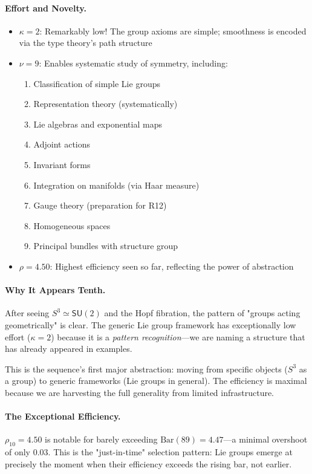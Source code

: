 \documentclass[11pt]{article}
\theoremstyle{definition}
\begin{document}
\paragraph{Effort and Novelty.}
\begin{itemize}
\item $\kappa = 2$: Remarkably low! The group axioms are simple; smoothness is encoded via the type theory's path structure
\item $\nu = 9$: Enables systematic study of symmetry, including:
\begin{enumerate}
\item Classification of simple Lie groups
\item Representation theory (systematically)
\item Lie algebras and exponential maps
\item Adjoint actions
\item Invariant forms
\item Integration on manifolds (via Haar measure)
\item Gauge theory (preparation for R12)
\item Homogeneous spaces
\item Principal bundles with structure group
\end{enumerate}
\item $\rho = 4.50$: Highest efficiency seen so far, reflecting the power of abstraction
\end{itemize}

\paragraph{Why It Appears Tenth.}
After seeing $S^3 \simeq \mathsf{SU}(2)$ and the Hopf fibration, the pattern of "groups acting geometrically" is clear. The generic Lie group framework has exceptionally low effort ($\kappa=2$) because it is a \emph{pattern recognition}—we are naming a structure that has already appeared in examples.

This is the sequence's first major abstraction: moving from specific objects ($S^3$ as a group) to generic frameworks (Lie groups in general). The efficiency is maximal because we are harvesting the full generality from limited infrastructure.

\paragraph{The Exceptional Efficiency.}
$\rho_{10} = 4.50$ is notable for barely exceeding $\text{Bar}(89) = 4.47$—a minimal overshoot of only $0.03$. This is the "just-in-time" selection pattern: Lie groups emerge at precisely the moment when their efficiency exceeds the rising bar, not earlier.
\end{document}
